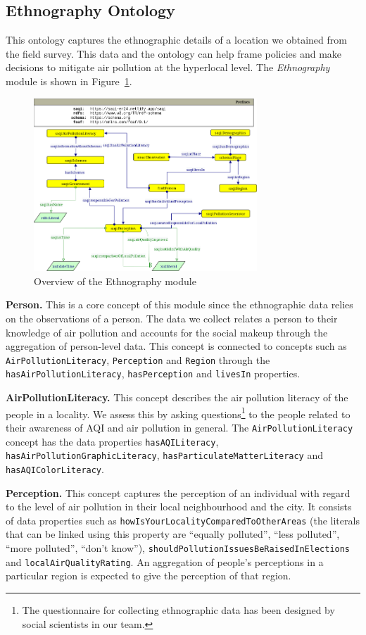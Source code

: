 \subsection{Ethnography Ontology}
This ontology captures the ethnographic details of a location we obtained from the field survey. This data and the ontology can help frame policies and make decisions to mitigate air pollution at the hyperlocal level. The \emph{Ethnography} module is shown in Figure~\ref{fig:ethnographic_concepts}.

\begin{figure}[ht]
\centering
\includegraphics[height=6.5cm]{figures/Ethnography.png}
\caption{Overview of the Ethnography module} 
\label{fig:ethnographic_concepts}
\end{figure}

\textbf{Person.} This is a core concept of this module since the ethnographic data relies on the observations of a person. The data we collect relates a person to their knowledge of air pollution and accounts for the social makeup through the aggregation of person-level data. This concept is connected to concepts such as \texttt{AirPollutionLiteracy}, \texttt{Perception} and \texttt{Region} through the \texttt{hasAirPollution\-Literacy}, \texttt{hasPerception} and \texttt{livesIn} properties.

\textbf{AirPollutionLiteracy.} This concept describes the air pollution literacy of the people in a locality. We assess this by asking questions\footnote{The questionnaire for collecting ethnographic data has been designed by social scientists in our team.} to the people related to their awareness of AQI and air pollution in general. The \texttt{AirPollutionLiteracy} concept has the data properties \texttt{hasAQILiteracy}, \texttt{hasAirPollutionGraphic\-Literacy}, \texttt{hasParticulateMatterLiteracy} and \texttt{hasAQIColorLiteracy}. 

\textbf{Perception.} This concept captures the perception of an individual with regard to the level of air pollution in their local neighbourhood and the city. It consists of data properties such as \texttt{howIsYourLocalityComparedToOtherAreas} (the literals that can be linked using this property are ``equally polluted'', ``less polluted'', ``more polluted'', ``don't know''), \texttt{shouldPollutionIssuesBeRaisedIn\-Elections} and \texttt{localAirQualityRating}. An aggregation of people's perceptions in a particular region is expected to give the perception of that region.

